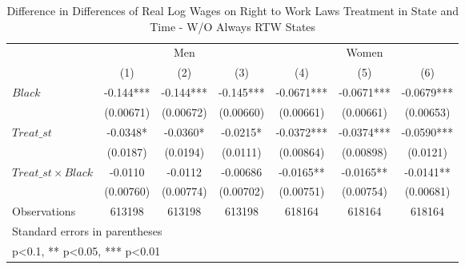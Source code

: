 \begin{table}[htbp]\centering
\def\sym#1{\ifmmode^{#1}\else\(^{#1}\)\fi}
\caption{Difference in Differences of Real Log Wages on Right to Work Laws Treatment in State and Time - W/O Always RTW States}
\begin{tabular}{l*{6}{c}}
\hline\hline
                    &\multicolumn{3}{c}{Men}                        &\multicolumn{3}{c}{Women}                      \\\cmidrule(lr){2-4}\cmidrule(lr){5-7}
                    &\multicolumn{1}{c}{(1)}   &\multicolumn{1}{c}{(2)}   &\multicolumn{1}{c}{(3)}   &\multicolumn{1}{c}{(4)}   &\multicolumn{1}{c}{(5)}   &\multicolumn{1}{c}{(6)}   \\
\hline
$ Black $           &      -0.144***&      -0.144***&      -0.145***&     -0.0671***&     -0.0671***&     -0.0679***\\
                    &   (0.00671)   &   (0.00672)   &   (0.00660)   &   (0.00661)   &   (0.00661)   &   (0.00653)   \\
[1em]
$ Treat\_{st} $      &     -0.0348*  &     -0.0360*  &     -0.0215*  &     -0.0372***&     -0.0374***&     -0.0590***\\
                    &    (0.0187)   &    (0.0194)   &    (0.0111)   &   (0.00864)   &   (0.00898)   &    (0.0121)   \\
[1em]
$ Treat\_{st} \times Black $&     -0.0110   &     -0.0112   &    -0.00686   &     -0.0165** &     -0.0165** &     -0.0141** \\
                    &   (0.00760)   &   (0.00774)   &   (0.00702)   &   (0.00751)   &   (0.00754)   &   (0.00681)   \\
\hline
Observations        &      613198   &      613198   &      613198   &      618164   &      618164   &      618164   \\
\hline\hline
\multicolumn{7}{l}{\footnotesize Standard errors in parentheses}\\
\multicolumn{7}{l}{\footnotesize * p<0.1, ** p<0.05, *** p<0.01}\\
\end{tabular}
\end{table}
